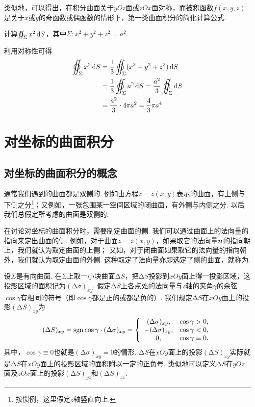 类似地，可以得出，在积分曲面关于\(yOz\)面或\(zOx\)面对称，而被积函数\(f(x,y,z)\)是关于\(x\)或\(y\)的奇函数或偶函数的情形下，第一类曲面积分的简化计算公式.

\begin{example}
计算\(\varoiint_{\Sigma} x^2 \dd{S}\)，其中\(\Sigma: x^2+y^2+z^2=a^2\).
\begin{solution}
利用对称性可得\begin{align*}
\varoiint_{\Sigma} x^2 \dd{S}
&= \frac{1}{3} \varoiint_{\Sigma} (x^2+y^2+z^2) \dd{S} \\
&= \frac{1}{3} \varoiint_{\Sigma} a^2 \dd{S}
= \frac{a^2}{3} \varoiint_{\Sigma} \dd{S} \\
&= \frac{a^2}{3} \cdot 4\pi a^2
= \frac{4}{3} \pi a^4.
\end{align*}
\end{solution}
\end{example}

\section{对坐标的曲面积分}
\subsection{对坐标的曲面积分的概念}
通常我们遇到的曲面都是双侧的.
例如由方程\(z = z(x,y)\)表示的曲面，有上侧与下侧之分\footnote{按惯例，这里假定\(z\)轴竖直向上.}；又例如，一张包围某一空间区域的闭曲面，有外侧与内侧之分.
以后我们总假定所考虑的曲面是双侧的.

在讨论对坐标的曲面积分时，需要制定曲面的侧.
我们可以通过曲面上的法向量的指向来定出曲面的侧.
例如，对于曲面\(z = z(x,y)\)，如果取它的法向量\(\boldsymbol{n}\)的指向朝上，我们就认为取定曲面的上侧；
又如，对于闭曲面如果取它的法向量的指向朝外，我们就认为取定曲面的外侧.
这种取定了法向量亦即选定了侧的曲面，就称为.

设\(\Sigma\)是有向曲面.
在\(\Sigma\)上取一小块曲面\(\increment S\)，把\(\increment S\)投影到\(xOy\)面上得一投影区域，这投影区域的面积记为\((\increment\sigma)_{xy}\).
假定\(\increment S\)上各点处的法向量与\(z\)轴的夹角\(\gamma\)的余弦\(\cos\gamma\)有相同的符号（即\(\cos\gamma\)都是正的或都是负的）.
我们规定\(\increment S\)在\(xOy\)面上的投影\((\increment S)_{xy}\)为\[
(\Delta S)_{xy}
= \operatorname{sgn}\cos\gamma \cdot (\Delta \sigma)_{xy}
= \left\{ \begin{array}{cc}
(\Delta \sigma)_{xy}, & \cos\gamma > 0, \\
-(\Delta \sigma)_{xy}, & \cos\gamma < 0, \\
0, & \cos\gamma \equiv 0.
\end{array} \right.
\]其中，\(\cos\gamma \equiv 0\)也就是\((\increment \sigma)_{xy} = 0\)的情形.
\(\increment S\)在\(xOy\)面上的投影\((\increment S)_{xy}\)实际就是\(\increment S\)在\(xOy\)面上的投影区域的面积附以一定的正负号.
类似地可以定义\(\increment S\)在\(yOz\)面及\(zOx\)面上的投影\((\increment S)_{yz}\)和\((\increment S)_{zx}\).

